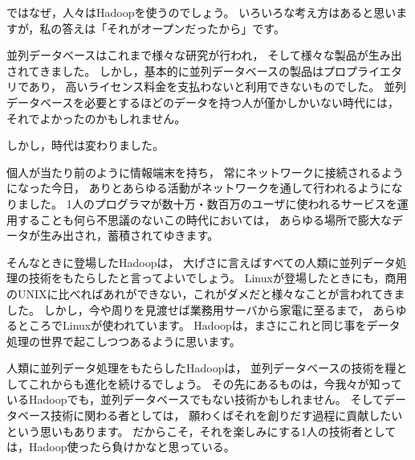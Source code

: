 ではなぜ，人々はHadoopを使うのでしょう。
いろいろな考え方はあると思いますが，私の答えは「それがオープンだったから」です。

並列データベースはこれまで様々な研究が行われ，
そして様々な製品が生み出されてきました。
しかし，基本的に並列データベースの製品はプロプライエタリであり，
高いライセンス料金を支払わないと利用できないものでした。
並列データベースを必要とするほどのデータを持つ人が僅かしかいない時代には，
それでよかったのかもしれません。

しかし，時代は変わりました。

個人が当たり前のように情報端末を持ち，
常にネットワークに接続されるようになった今日，
ありとあらゆる活動がネットワークを通して行われるようになりました。
1人のプログラマが数十万・数百万のユーザに使われるサービスを運用することも何ら不思議のないこの時代においては，
あらゆる場所で膨大なデータが生み出され，蓄積されてゆきます。

そんなときに登場したHadoopは，
大げさに言えばすべての人類に並列データ処理の技術をもたらしたと言ってよいでしょう。
Linuxが登場したときにも，商用のUNIXに比べればあれができない，これがダメだと様々なことが言われてきました。
しかし，今や周りを見渡せば業務用サーバから家電に至るまで，
あらゆるところでLinuxが使われています。
Hadoopは，まさにこれと同じ事をデータ処理の世界で起こしつつあるように思います。

人類に並列データ処理をもたらしたHadoopは，
並列データベースの技術を糧としてこれからも進化を続けるでしょう。
その先にあるものは，今我々が知っているHadoopでも，並列データベースでもない技術かもしれません。
そしてデータベース技術に関わる者としては，
願わくばそれを創りだす過程に貢献したいという思いもあります。
だからこそ，それを楽しみにする1人の技術者としては，Hadoop使ったら負けかなと思っている。
